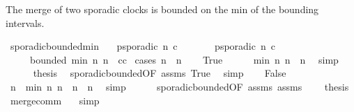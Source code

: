 \begin{isabellebody}
%
\endisadelimproof
%
\isadelimdocument
%
\endisadelimdocument
%
\isatagdocument
%
\isamarkuptrue%
%
\endisatagdocument
{\isafolddocument}%
%
\isadelimdocument
%
\endisadelimdocument
%
\begin{isamarkuptext}%
The merge of two sporadic clocks is bounded on the min of the bounding intervals.%
\end{isamarkuptext}\isamarkuptrue%
\isamarkupfalse%
\ sporadic{\isacharunderscore}bounded{\isacharunderscore}min{\isacharcolon}\isanewline
\ \ \ {\isacartoucheopen}p{\isacharunderscore}sporadic\ n\ c{\isacartoucheclose}\isanewline
\ \ \ \ \ \ \ {\isacartoucheopen}p{\isacharunderscore}sporadic\ n{\isacharprime}\ c{\isacharprime}{\isacartoucheclose}\isanewline
\ \ \ \ \ {\isacartoucheopen}bounded\ {\isacharparenleft}{\isacharparenleft}min\ n\ n{\isacharprime}{\isacharparenright}{\isacharplus}{}{\isacharparenright}\ {}\ {\isacharparenleft}c{\isasymoplus}c{\isacharprime}{\isacharparenright}{\isacartoucheclose}\isanewline
%
\isadelimproof
%
\endisadelimproof
%
\isatagproof
{}\isamarkupfalse%
\ {\isacharparenleft}cases\ {\isacartoucheopen}n\ {\isasymle}\ n{\isacharprime}{\isacartoucheclose}{\isacharparenright}\isanewline
\ \ \isamarkupfalse%
\ True\isanewline
\ \ \ \ \isamarkupfalse%
\ {\isacartoucheopen}min\ n\ n{\isacharprime}\ {\isacharequal}\ n{\isacartoucheclose}\ \isamarkupfalse%
\ simp\isanewline
\ \ \ \ \isamarkupfalse%
\ {\isacharquery}thesis\ \isamarkupfalse%
\ sporadic{\isacharunderscore}bounded{}{\isacharbrackleft}OF\ assms\ True{\isacharbrackright}\ \isamarkupfalse%
\ simp\isanewline
{}\isamarkupfalse%
\isanewline
\ \ \isamarkupfalse%
\ False\isanewline
\ \ \ \ \isamarkupfalse%
\ {}{\isacharcolon}{\isacartoucheopen}n{\isacharprime}\ {\isacharequal}\ min\ n\ n{\isacharprime}{\isacartoucheclose}\ \ {}{\isacharcolon}{\isacartoucheopen}n{\isacharprime}\ {\isasymle}\ n{\isacartoucheclose}\ \isamarkupfalse%
\ simp{\isacharplus}\isanewline
\ \ \ \ \isamarkupfalse%
\ sporadic{\isacharunderscore}bounded{}{\isacharbrackleft}OF\ assms{\isacharparenleft}{}{\isacharparenright}\ assms{\isacharparenleft}{}{\isacharparenright}\ {}{\isacharbrackright}\ {}\ \isamarkupfalse%
\ {\isacharquery}thesis\ \isamarkupfalse%
\ merge{\isacharunderscore}comm\ \ \isamarkupfalse%
\ simp\isanewline
{}\isamarkupfalse%
%
\endisatagproof
{\isafoldproof}%
%
\isadelimproof
\isanewline
%
\endisadelimproof
\isanewline
%
\isadelimtheory
\isanewline
%
\endisadelimtheory
%
\isatagtheory
{}\isamarkupfalse%
%
\endisatagtheory
{\isafoldtheory}%
%
\isadelimtheory
%
\endisadelimtheory
%
\end{isabellebody}%
